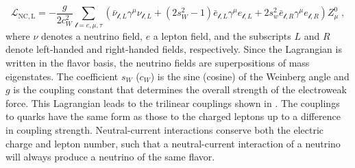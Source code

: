 \begin{equation}
  \mathcal{L}_\mathrm{NC,L} = -\frac{g}{2 c_W^2} \sum_{\mathcal{l}=e,\mu,\tau} (\bar{\nu}_{\mathcal{l}, L} \gamma^\mu \nu_{\mathcal{l}, L} + (2 s_W^2 - 1) \bar{e}_{\mathcal{l}, L} \gamma^\mu e_{\mathcal{l}, L} + 2s_w^2 \bar{e}_{\mathcal{l}, R} \gamma^\mu e_{\mathcal{l}, R}) Z^0_\mu\;, \label{eq:ew-nc-lagrangian}
\end{equation}
where $\nu$ denotes a neutrino field, $e$ a lepton field, and the subscripts $L$ and $R$ denote left-handed and right-handed fields, respectively. Since the Lagrangian is written in the flavor basis, the neutrino fields are superpositions of mass eigenstates. The coefficient $s_W$ ($c_W$) is the sine (cosine) of the Weinberg angle and $g$ is the coupling constant that determines the overall strength of the electroweak force. This Lagrangian leads to the trilinear couplings shown in . The couplings to quarks have the same form as those to the charged leptons up to a difference in coupling strength. Neutral-current interactions conserve both the electric charge and lepton number, such that a neutral-current interaction of a neutrino will always produce a neutrino of the same flavor.

